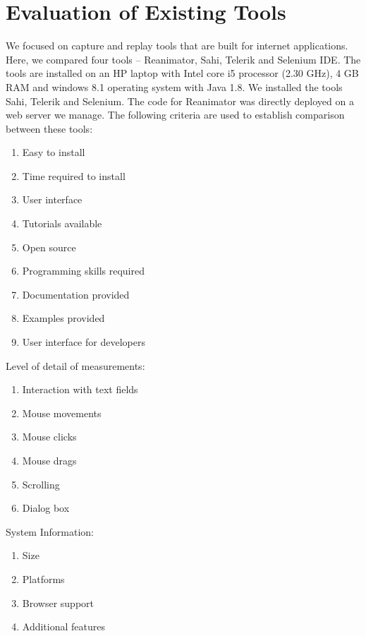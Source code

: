 \documentclass[10pt,journal]{IEEEtran}
\begin{document}
\section{Evaluation of Existing Tools}
We focused on capture and replay tools that are built for internet applications. Here, we compared four tools – Reanimator, Sahi, Telerik and Selenium IDE. The tools are installed on an HP laptop with Intel core i5 processor (2.30 GHz), 4 GB RAM and windows 8.1 operating system with Java 1.8. We installed the tools Sahi, Telerik and Selenium. The code for Reanimator was directly deployed on a web server we manage.
The following criteria are used to establish comparison between these tools:
\begin{enumerate}
\item Easy to install
\item Time required to install
\item User interface
\item Tutorials available
\item Open source
\item Programming skills required
\item Documentation provided
\item Examples provided
\item User interface for developers
\end{enumerate}
Level of detail of measurements:
\begin{enumerate}
\item Interaction with text fields
\item Mouse movements
\item Mouse clicks
\item Mouse drags
\item Scrolling
\item Dialog box
\end{enumerate}
System Information:
\begin{enumerate}
\item Size
\item Platforms
\item Browser support
\item Additional features
\end{enumerate}

\printbibliography
\end{document}
